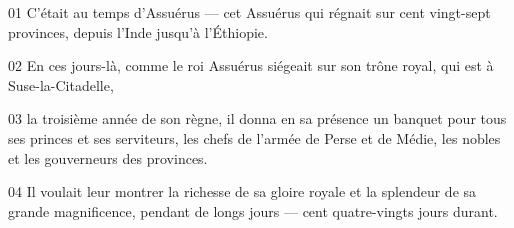 01 C’était au temps d’Assuérus --- cet Assuérus qui régnait sur cent vingt-sept provinces, depuis l’Inde jusqu’à l’Éthiopie.

02 En ces jours-là, comme le roi Assuérus siégeait sur son trône royal, qui est à Suse-la-Citadelle,

03 la troisième année de son règne, il donna en sa présence un banquet pour tous ses princes et ses serviteurs, les chefs de l’armée de Perse et de Médie, les nobles et les gouverneurs des provinces.

04 Il voulait leur montrer la richesse de sa gloire royale et la splendeur de sa grande magnificence, pendant de longs jours --- cent quatre-vingts jours durant.
